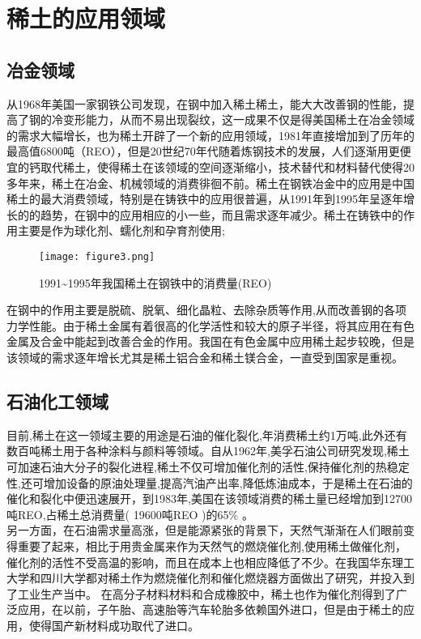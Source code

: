 \documentclass[twoside,twocolumn]{article}
\begin{document}

\section{稀土的应用领域}

\subsection{冶金领域}
从1968年美国一家钢铁公司发现，在钢中加入稀土稀土，能大大改善钢的性能，提高了钢的冷变形能力，从而不易出现裂纹，这一成果不仅是得美国稀土在冶金领域的需求大幅增长，也为稀土开辟了一个新的应用领域，1981年直接增加到了历年的最高值6800吨（REO），但是20世纪70年代随着炼钢技术的发展，人们逐渐用更便宜的钙取代稀土，使得稀土在该领域的空间逐渐缩小，技术替代和材料替代使得20多年来，稀土在冶金、机械领域的消费徘徊不前。\cite{RN2}稀土在钢铁冶金中的应用是中国稀土的最大消费领域，特别是在铸铁中的应用很普遍，从1991年到1995年呈逐年增长的的趋势，在钢中的应用相应的小一些，而且需求逐年减少。稀土在铸铁中的作用主要是作为球化剂、蠕化剂和孕育剂使用;
 \begin{figure}[ht]
   \centering
   \texttt{[image: figure3.png]}
   \caption{1991\~{}1995年我国稀土在钢铁中的消费量(REO)}\cite{RN3}
 \end{figure}
 在钢中的作用主要是脱硫、脱氧、细化晶粒、去除杂质等作用,从而改善钢的各项力学性能。由于稀土金属有着很高的化学活性和较大的原子半径，将其应用在有色金属及合金中能起到改善合金的作用。我国在有色金属中应用稀土起步较晚，但是该领域的需求逐年增长尤其是稀土铝合金和稀土镁合金，一直受到国家是重视。
\subsection{石油化工领域}
目前,稀土在这一领域主要的用途是石油的催化裂化,年消费稀土约1万吨,此外还有数百吨稀土用于各种涂料与颜料等领域。自从1962年,美孚石油公司研究发现,稀土可加速石油大分子的裂化进程,稀土不仅可增加催化剂的活性,保持催化剂的热稳定性,还可增加设备的原油处理量,提高汽油产出率,降低炼油成本，于是稀土在石油的催化和裂化中便迅速展开，到1983年,美国在该领域消费的稀土量已经增加到12700吨REO,占稀土总消费量( 19600吨REO )的65$\%$ 。\cite{RN2}\\
另一方面，在石油需求量高涨，但是能源紧张的背景下，天然气渐渐在人们眼前变得重要了起来，相比于用贵金属来作为天然气的燃烧催化剂,使用稀土做催化剂，催化剂的活性不受高温的影响，而且在成本上也相应降低了不少。在我国华东理工大学和四川大学都对稀土作为燃烧催化剂和催化燃烧器方面做出了研究，并投入到了工业生产当中。
在高分子材料材料和合成橡胶中，稀土也作为催化剂得到了广泛应用，在以前，子午胎、高速胎等汽车轮胎多依赖国外进口，但是由于稀土的应用，使得国产新材料成功取代了进口。
\end{document}
